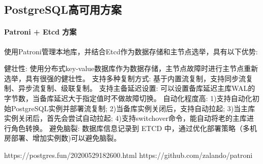 \documentclass[../../../interview-questions.tex]{subfiles}
\begin{document}
\subsection{PostgreSQL高可用方案}

\paragraph{Patroni + Etcd 方案}

使用Patroni管理本地库，并结合Etcd作为数据存储和主节点选举，具有以下优势:

健壮性: 使用分布式key-value数据库作为数据存储，主节点故障时进行主节点重新选举，具有很强的健壮性。
支持多种复制方式: 基于内置流复制，支持同步流复制、异步流复制、级联复制。
支持主备延迟设置: 可以设置备库延迟主库WAL的字节数，当备库延迟大于指定值时不做故障切换。
自动化程度高: 1)支持自动化初始PostgreSQL实例并部署流复制; 2)当备库实例关闭后，支持自动拉起; 3)当主库实例关闭后，首先会尝试自动拉起; 4)支持switchover命令，能自动将老的主库进行角色转换。
避免脑裂: 数据库信息记录到 ETCD 中，通过优化部署策略（多机房部署、增加实例数)可以避免脑裂。

https://postgres.fun/20200529182600.html
https://github.com/zalando/patroni
\end{document}
